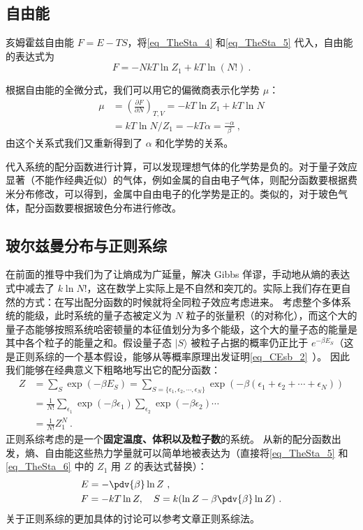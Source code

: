 \subsection{自由能}
亥姆霍兹自由能 $F=E-TS$，将\autoref{eq_TheSta_4} 和\autoref{eq_TheSta_5} 代入，自由能的表达式为
\begin{equation}\label{eq_TheSta_6}
F=-NkT\ln Z_1+kT\ln(N!)~.
\end{equation}

根据自由能的全微分式，我们可以用它的偏微商表示化学势 $\mu$：
\begin{equation}
\begin{aligned}
\mu&=\left(\frac{\partial F}{\partial N}\right)_{T,V}=-kT\ln Z_1+kT\ln N\\
&=kT\ln N/Z_1=-kT\alpha=\frac{-\alpha}{\beta}~,
\end{aligned}
\end{equation}
由这个关系式我们又重新得到了 $\alpha$ 和化学势的关系。

代入系统的配分函数进行计算，可以发现理想气体的化学势是负的。对于量子效应显著（不能作经典近似）的气体，例如金属的自由电子气体，则配分函数要根据费米分布修改，可以得到，金属中自由电子的化学势是正的。类似的，对于玻色气体，配分函数要根据玻色分布进行修改。

\subsection{玻尔兹曼分布与正则系综}
在前面的推导中我们为了让熵成为广延量，解决 Gibbs 佯谬，手动地从熵的表达式中减去了 $k\ln N!$，这在数学上实际上是不自然和突兀的。实际上我们存在更自然的方式：在写出配分函数的时候就将全同粒子效应考虑进来。
考虑整个多体系统的能级，此时系统的量子态被定义为 $N$ 粒子的张量积（的对称化），而这个大的量子态能够按照系统哈密顿量的本征值划分为多个能级，这个大的量子态的能量是其中各个粒子的能量之和。假设量子态 $|S\rangle$ 被粒子占据的概率仍正比于 $e^{-\beta E_S}$（这是正则系综的一个基本假设，能够从等概率原理出发证明\autoref{eq_CEsb_2}~）。 因此我们能够在经典意义下粗略地写出它的配分函数：
\begin{equation}
\begin{aligned}
Z&=\sum_{S} \exp(-\beta E_S)=\sum_{S=\{\epsilon_1,\epsilon_2,\cdots,\epsilon_N\}}\exp(-\beta(\epsilon_1+\epsilon_2+\cdots+\epsilon_N))\\
&=\frac{1}{N!} \sum_{\epsilon_1}\exp(-\beta \epsilon_1) \sum_{\epsilon_2}\exp(-\beta\epsilon_2)\cdots\\
&=\frac{1}{N!}Z_1^N~.
\end{aligned}
\end{equation}
正则系综考虑的是一个\textbf{固定温度、体积以及粒子数}的系统。
从新的配分函数出发，熵、自由能这些热力学量就可以简单地被表达为（直接将\autoref{eq_TheSta_5} 和 \autoref{eq_TheSta_6} 中的 $Z_1$ 用 $Z$ 的表达式替换）：
\begin{equation}
\begin{aligned}
&E=-\pdv{\beta}\ln Z~,\\
&F=-kT\ln Z,\quad S=k(\ln Z-\beta \pdv{\beta}\ln Z)~.
\end{aligned}
\end{equation}
关于正则系综的更加具体的讨论可以参考文章正则系综法。
